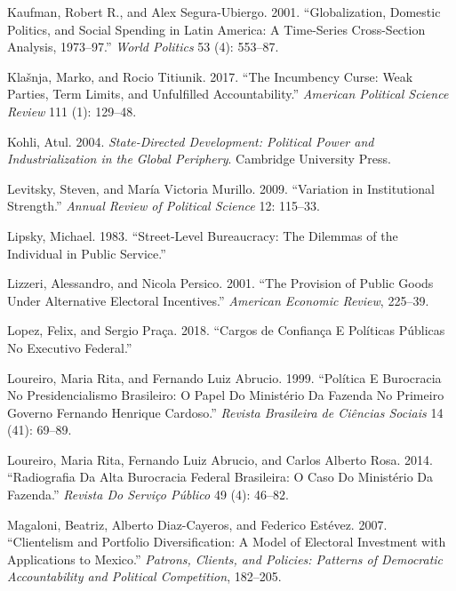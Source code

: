 \documentclass[12pt,]{article}
\begin{document}
\leavevmode\hypertarget{ref-kaufman_globalization_2001}{}%
Kaufman, Robert R., and Alex Segura-Ubiergo. 2001. ``Globalization,
Domestic Politics, and Social Spending in Latin America: A Time-Series
Cross-Section Analysis, 1973--97.'' \emph{World Politics} 53 (4):
553--87.

\leavevmode\hypertarget{ref-klasnja_incumbency_2017}{}%
Klašnja, Marko, and Rocio Titiunik. 2017. ``The Incumbency Curse: Weak
Parties, Term Limits, and Unfulfilled Accountability.'' \emph{American
Political Science Review} 111 (1): 129--48.

\leavevmode\hypertarget{ref-kohli_state-directed_2004}{}%
Kohli, Atul. 2004. \emph{State-Directed Development: Political Power and
Industrialization in the Global Periphery}. Cambridge University Press.

\leavevmode\hypertarget{ref-levitsky_variation_2009}{}%
Levitsky, Steven, and María Victoria Murillo. 2009. ``Variation in
Institutional Strength.'' \emph{Annual Review of Political Science} 12:
115--33.

\leavevmode\hypertarget{ref-lipsky_street-level_1983}{}%
Lipsky, Michael. 1983. ``Street-Level Bureaucracy: The Dilemmas of the
Individual in Public Service.''

\leavevmode\hypertarget{ref-lizzeri_provision_2001}{}%
Lizzeri, Alessandro, and Nicola Persico. 2001. ``The Provision of Public
Goods Under Alternative Electoral Incentives.'' \emph{American Economic
Review}, 225--39.

\leavevmode\hypertarget{ref-lopez_cargos_2018}{}%
Lopez, Felix, and Sergio Praça. 2018. ``Cargos de Confiança E Políticas
Públicas No Executivo Federal.''

\leavevmode\hypertarget{ref-loureiro_politica_1999}{}%
Loureiro, Maria Rita, and Fernando Luiz Abrucio. 1999. ``Política E
Burocracia No Presidencialismo Brasileiro: O Papel Do Ministério Da
Fazenda No Primeiro Governo Fernando Henrique Cardoso.'' \emph{Revista
Brasileira de Ciências Sociais} 14 (41): 69--89.

\leavevmode\hypertarget{ref-loureiro_radiografia_2014}{}%
Loureiro, Maria Rita, Fernando Luiz Abrucio, and Carlos Alberto Rosa.
2014. ``Radiografia Da Alta Burocracia Federal Brasileira: O Caso Do
Ministério Da Fazenda.'' \emph{Revista Do Serviço Público} 49 (4):
46--82.

\leavevmode\hypertarget{ref-magaloni_clientelism_2007}{}%
Magaloni, Beatriz, Alberto Diaz-Cayeros, and Federico Estévez. 2007.
``Clientelism and Portfolio Diversification: A Model of Electoral
Investment with Applications to Mexico.'' \emph{Patrons, Clients, and
Policies: Patterns of Democratic Accountability and Political
Competition}, 182--205.
\end{document}
